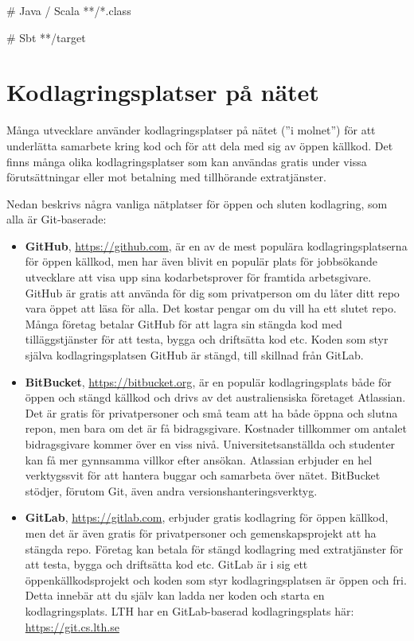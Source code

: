 \begin{itemize}[leftmargin=*]
\begin{Code}[language=]
# Java / Scala
**/*.class

# Sbt
**/target

\end{Code} 


\end{itemize}
 

\clearpage 
  
\section{Kodlagringsplatser på nätet}\label{section:code-hosting}

Många utvecklare använder kodlagringsplatser på nätet (''i molnet'')  för att underlätta samarbete kring kod och för att dela med sig av öppen källkod. Det finns många olika kodlagringsplatser som kan användas gratis under vissa förutsättningar eller mot betalning med tillhörande extratjänster. 

Nedan beskrivs några vanliga nätplatser för öppen och sluten kodlagring, som alla är Git-baserade:

\begin{itemize}
\item  \textbf{GitHub}, \url{https://github.com}, är en av de mest populära kodlagringsplatserna för öppen källkod, men har även blivit en populär plats för jobbsökande utvecklare att visa upp sina  kodarbetsprover för framtida arbetsgivare. GitHub är gratis att använda för dig som privatperson om du låter ditt repo vara öppet att läsa för alla. Det kostar pengar om du vill ha ett slutet repo. Många företag betalar GitHub för att lagra sin stängda kod med tilläggstjänster för att testa, bygga och driftsätta kod etc. Koden som styr själva kodlagringsplatsen GitHub är stängd, till skillnad från GitLab.

\item \textbf{BitBucket}, \url{https://bitbucket.org}, är en populär kodlagringsplats både för öppen och stängd källkod och drivs av det australiensiska företaget Atlassian. Det är gratis för privatpersoner och små team att ha både öppna och slutna repon, men bara om det är få bidragsgivare. Kostnader tillkommer om antalet bidragsgivare kommer över en viss nivå. Universitetsanställda och studenter kan få mer gynnsamma villkor efter ansökan. Atlassian erbjuder en hel verktygssvit för att hantera buggar och samarbeta över nätet. BitBucket stödjer, förutom Git, även andra versionshanteringsverktyg.

\item \textbf{GitLab}, \url{https://gitlab.com}, erbjuder gratis kodlagring för öppen källkod, men det är även gratis för privatpersoner och gemenskapsprojekt att ha stängda repo. Företag kan betala för stängd kodlagring med extratjänster för att testa, bygga och driftsätta kod etc. GitLab är i sig ett öppenkällkodsprojekt och koden som styr kodlagringsplatsen är öppen och fri. Detta innebär att du själv kan ladda ner koden och starta en kodlagringsplats. LTH har en GitLab-baserad kodlagringsplats här: \url{https://git.cs.lth.se}

\end{itemize}


